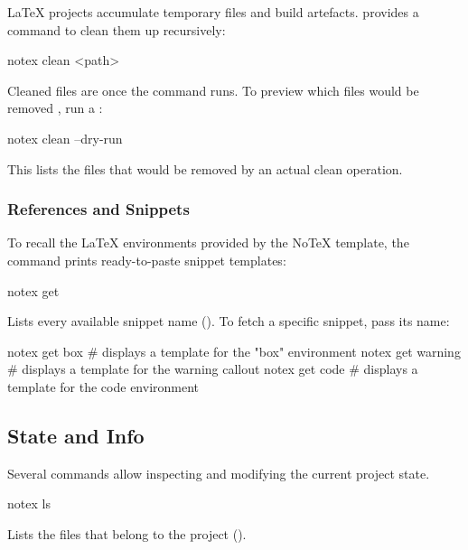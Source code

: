 \documentclass[../main.tex]{subfiles}
\begin{document}
\LaTeX{} projects accumulate temporary files and build artefacts.  provides a command to clean them up recursively:

\begin{bash}
    notex clean <path>
\end{bash}

\begin{warning}
    Cleaned files are  once the command runs. To preview which files would be removed , run a :

    \begin{bash}
        notex clean --dry-run
    \end{bash}

    This lists the files that would be removed by an actual clean operation.
\end{warning}

\subsubsection{References and Snippets}

To recall the \LaTeX{} environments provided by the NoTeX template, the  command prints ready-to-paste snippet templates:

\begin{bash}
    notex get
\end{bash}

Lists every available snippet name ().
To fetch a specific snippet, pass its name:

\begin{bash}
    notex get box       # displays a template for the "box" environment
    notex get warning   # displays a template for the warning callout
    notex get code      # displays a template for the code environment
\end{bash}

\subsection{State and Info}

Several commands allow inspecting and modifying the current project state.

\begin{bash}
    notex ls
\end{bash}

Lists the files that belong to the project ().
\end{document}

